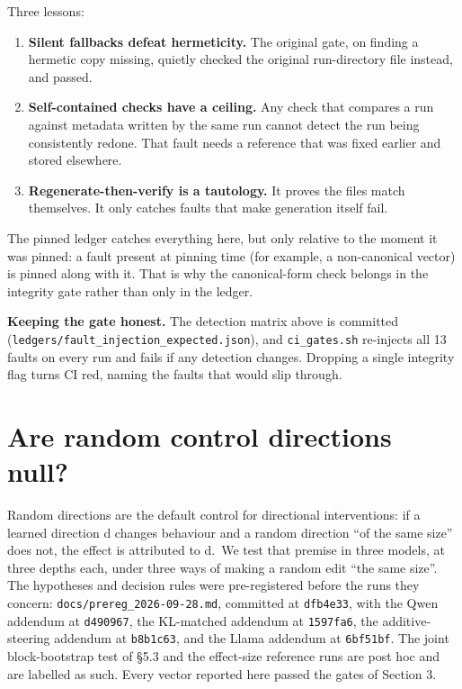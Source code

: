 \documentclass[
  10pt,
]{article}
\providecommand{\tightlist}{%
  \setlength{\itemsep}{0pt}\setlength{\parskip}{0pt}}
\begin{document}
Three lessons:

\begin{enumerate}
\def\labelenumi{\arabic{enumi}.}
\tightlist
\item
  \textbf{Silent fallbacks defeat hermeticity.} The original gate, on
  finding a hermetic copy missing, quietly checked the original
  run-directory file instead, and passed.
\item
  \textbf{Self-contained checks have a ceiling.} Any check that compares
  a run against metadata written by the same run cannot detect the run
  being consistently redone. That fault needs a reference that was fixed
  earlier and stored elsewhere.
\item
  \textbf{Regenerate-then-verify is a tautology.} It proves the files
  match themselves. It only catches faults that make generation itself
  fail.
\end{enumerate}

The pinned ledger catches everything here, but only relative to the
moment it was pinned: a fault present at pinning time (for example, a
non-canonical vector) is pinned along with it. That is why the
canonical-form check belongs in the integrity gate rather than only in
the ledger.

\textbf{Keeping the gate honest.} The detection matrix above is
committed (\texttt{ledgers/fault\_injection\_expected.json}), and
\texttt{ci\_gates.sh} re-injects all 13 faults on every run and fails if
any detection changes. Dropping a single integrity flag turns CI red,
naming the faults that would slip through.

\section{Are random control directions
null?}\label{are-random-control-directions-null}

Random directions are the default control for directional interventions:
if a learned direction d changes behaviour and a random direction ``of
the same size'' does not, the effect is attributed to d.~We test that
premise in three models, at three depths each, under three ways of
making a random edit ``the same size''. The hypotheses and decision
rules were pre-registered before the runs they concern:
\texttt{docs/prereg\_2026-09-28.md}, committed at \texttt{dfb4e33}, with
the Qwen addendum at \texttt{d490967}, the KL-matched addendum at
\texttt{1597fa6}, the additive-steering addendum at \texttt{b8b1c63},
and the Llama addendum at \texttt{6bf51bf}. The joint block-bootstrap
test of §5.3 and the effect-size reference runs are post hoc and are
labelled as such. Every vector reported here passed the gates of Section
3.
\end{document}
